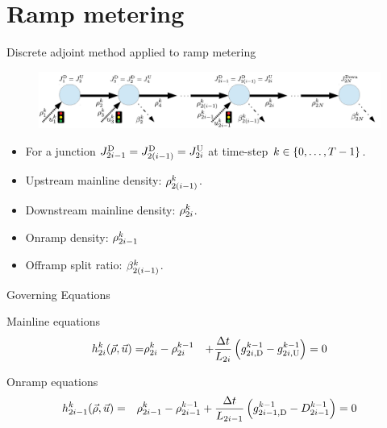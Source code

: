 \section{Ramp metering} %
\label{sec:demo_ramp_metering}


\begin{frame}{Discrete adjoint method applied to ramp metering}

\begin{figure}
\begin{centering}
\includegraphics[width=1\columnwidth]{../figs-gen/rm-junction-2}
\par\end{centering}
\end{figure}

\begin{itemize}
\item For a junction $J_{2i-1}^{\text{D}}=J_{2\left(i-1\right)}^{\text{D}}=J_{2i}^{\text{U}}$ at time-step $k\in\left\{ 0,\ldots,T-1\right\}$.
\item Upstream mainline density: $\rho_{2\left(i-1\right)}^{k}$.
 \item Downstream mainline density: $\rho_{2i}^{k}$.
 \item Onramp density: $\rho_{2i-1}^{k}$
 \item Offramp split ratio: $\beta_{2\left(i-1\right)}^{k}$.
\end{itemize}


\end{frame}

\begin{frame}{Governing Equations}
\begin{block}{Mainline equations}
\begin{eqnarray*}
h_{2i}^{k}(\vec{\rho},\vec{u})= & \rho_{2i}^{k}-\rho_{2i}^{k-1} & +\frac{\Delta t}{L_{2i}}\left(g_{2i,\text{D}}^{k-1}-g_{2i,\text{U}}^{k-1}\right)=0
	\end{eqnarray*}
\end{block}

\begin{block}{Onramp equations}
\begin{eqnarray*}
h_{2i-1}^{k}(\vec{\rho},\vec{u}) & = & \rho_{2i-1}^{k}-\rho_{2i-1}^{k-1}+\frac{\Delta t}{L_{2i-1}}\left(g_{2i-1,\text{D}}^{k-1}-D_{2i-1}^{k-1}\right)=0
 \end{eqnarray*}
\end{block}

\end{frame}


